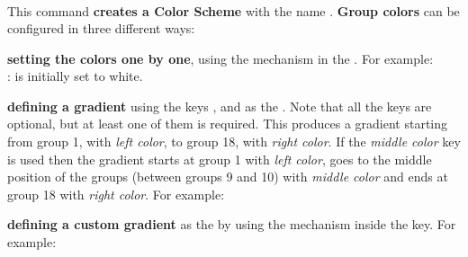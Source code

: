 \subsubsection*{}{\pgfPTMlibsubsubsection{\tmpSection}}%
\label{command:pgfPTGroupColors}%
%
\\ [10pt]This command \textbf{creates a Color Scheme} with the name . \textbf{Group colors} can be configured in three different ways:
\vspace{4pt}
\begin{itemlist}
\item\textbf{setting the colors one by one}, using the \textit{} mechanism in the . For example:
\\ [3pt]:  is initially set to white.
\item\textbf{defining a gradient} using the keys ,  and  as the . Note that all the keys are optional, but at least one of them is required. This produces a gradient starting from group 1, with \textit{left color}, to group 18, with \textit{right color}. If the \textit{middle color} key is used then the gradient starts at group 1 with \textit{left color}, goes to the middle position of the groups (between groups 9 and 10) with \textit{middle color} and ends at group 18 with \textit{right color}. For example:
\item\textbf{defining a custom gradient} as the  by using the \textit{} mechanism inside the  key. For example:
\end{itemlist}
